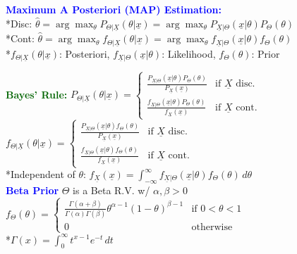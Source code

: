 \documentclass[5pt]{extarticle} %
\begin{document}
\begin{paracol}{3}
{    \textcolor{blue}{\textbf{Maximum A Posteriori (MAP) Estimation:}} \\
    *Disc: $\hat{\theta} = \arg \max_\theta P_{\Theta | \underline{X}} (\theta | \underline{x}) = \arg \max_\theta P_{\underline{X} | \Theta} (\underline{x} | \theta) P_\Theta (\theta)$\\
    *Cont: $\hat{\theta} = \arg \max_\theta f_{\Theta | \underline{X}} (\theta | \underline{x}) = \arg \max_\theta f_{\underline{X} | \Theta} (\underline{x} | \theta) f_\Theta (\theta)$ \\
    *$f_{\Theta | \underline{X}} (\theta | \underline{x})$: Posteriori, $f_{\underline{X} | \Theta} (\underline{x} | \theta)$: Likelihood, $f_\Theta (\theta)$: Prior

    \textcolor{darkgreen}{\textbf{Bayes' Rule:}} $P_{\Theta | \underline{X}} (\theta | \underline{x}) = \begin{cases}
        \frac{P_{\underline{X} | \Theta} (\underline{x} | \theta) P_\Theta (\theta)}{P_{\underline{X}} (\underline{x})} & \text{if } \underline{X} \text{ disc.} \\
        \frac{f_{\underline{X} | \Theta} (\underline{x} | \theta) P_\Theta (\theta)}{f_{\underline{X}} (\underline{x})} & \text{if } \underline{X} \text{ cont.}
    \end{cases}$ \\
    $f_{\Theta | \underline{X}} (\theta | \underline{x}) = \begin{cases}
        \frac{P_{\underline{X} | \Theta} (\underline{x} | \theta) f_\Theta (\theta)}{P_{\underline{X}} (\underline{x})} & \text{if } \underline{X} \text{ disc.} \\
        \frac{f_{\underline{X} | \Theta} (\underline{x} | \theta) f_\Theta (\theta)}{f_{\underline{X}} (\underline{x})} & \text{if } \underline{X} \text{ cont.} 
    \end{cases}$ \\
    *Independent of $\theta$: $f_{\underline{X}} (\underline{x}) = \int_{-\infty}^{\infty} f_{\underline{X} | \Theta} (\underline{x} | \theta) f_\Theta (\theta) \, d\theta$ \\

    \textcolor{blue}{\textbf{Beta Prior}} $\Theta$ is a Beta R.V. w/ $\alpha,\beta>0$\\
    $f_\Theta (\theta) = \begin{cases}
        \frac{\Gamma(\alpha + \beta)}{\Gamma(\alpha) \Gamma(\beta)} \theta^{\alpha - 1} (1 - \theta)^{\beta - 1} & \text{if } 0 < \theta < 1 \\
        0 & \text{otherwise}
    \end{cases}$ \\
    *$\Gamma(x) = \int_{0}^{\infty} t^{x-1} e^{-t} \, dt$

}
\end{paracol}
\end{document}
